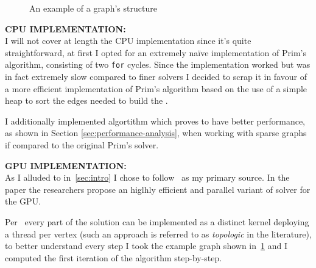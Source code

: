 \documentclass[a4paper,10pt]{article}
\begin{document}
\begin{figure}
	\centering
	
	\caption{An example of a graph's \csr structure}
	\label{tikz:csr-struct}
\end{figure}

\bigskip
{}
\makeatletter{}\makeatother\label{sec:cpu-implementation}
\noindent
\textbf{CPU IMPLEMENTATION:}
\\
I will not cover at length the CPU implementation since it's quite straightforward, at first I opted
for an extremely na\"ive implementation of Prim's algorithm, consisting of two \texttt{for} cycles.
Since the implementation worked but was in fact extremely slow compared to finer solvers I
decided to scrap it in favour of a more efficient implementation of Prim's algorithm based on
the use of a simple heap to sort the edges needed to build the \mst.

I additionally implemented \brkas algortithm which proves to have better performance, as shown in Section \ref{sec:performance-analysis}, when working with sparse graphs if compared to the original Prim's solver.

\bigskip
{}
\makeatletter\def\@currentlabel{\texttt{(IV)}}\makeatother\label{sec:gpu-implementation}
\noindent
\textbf{GPU IMPLEMENTATION:}
\\
As I alluded to in~\ref{sec:intro} I chose to follow~\cite{generic-he-boruvka} as my primary source. In the paper the researchers propose an higlhly efficient and parallel variant of \brkas solver for the GPU.

Per~\cite{generic-he-boruvka} every part of the solution can be implemented as a distinct kernel
deploying a thread per vertex (such an approach is referred to as \textit{topologic} in the
literature), to better understand every step I took the example graph shown in~\ref{tikz:csr-struct} and I computed the first iteration of the algorithm step-by-step.
\end{document}
